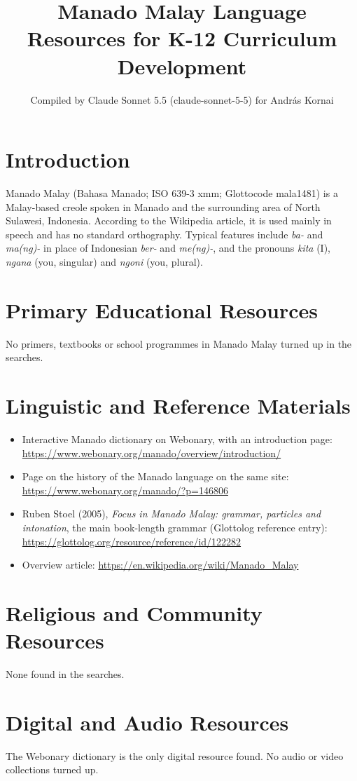 \documentclass[12pt]{article}
\title{Manado Malay Language Resources for K-12 Curriculum Development}
\author{Compiled by Claude Sonnet 5.5 (claude-sonnet-5-5) for Andr\'as Kornai}
\date{}
\begin{document}
\maketitle

\section{Introduction}
Manado Malay (Bahasa Manado; ISO 639-3 xmm; Glottocode mala1481) is a Malay-based creole spoken in Manado and the surrounding area of North Sulawesi, Indonesia. According to the Wikipedia article, it is used mainly in speech and has no standard orthography. Typical features include \emph{ba-} and \emph{ma(ng)-} in place of Indonesian \emph{ber-} and \emph{me(ng)-}, and the pronouns \emph{kita} (I), \emph{ngana} (you, singular) and \emph{ngoni} (you, plural).

\section{Primary Educational Resources}
No primers, textbooks or school programmes in Manado Malay turned up in the searches.

\section{Linguistic and Reference Materials}
\begin{itemize}
\item Interactive Manado dictionary on Webonary, with an introduction page: \url{https://www.webonary.org/manado/overview/introduction/}
\item Page on the history of the Manado language on the same site: \url{https://www.webonary.org/manado/?p=146806}
\item Ruben Stoel (2005), \emph{Focus in Manado Malay: grammar, particles and intonation}, the main book-length grammar (Glottolog reference entry): \url{https://glottolog.org/resource/reference/id/122282}
\item Overview article: \url{https://en.wikipedia.org/wiki/Manado_Malay}
\end{itemize}

\section{Religious and Community Resources}
None found in the searches.

\section{Digital and Audio Resources}
The Webonary dictionary is the only digital resource found. No audio or video collections turned up.
\end{document}

